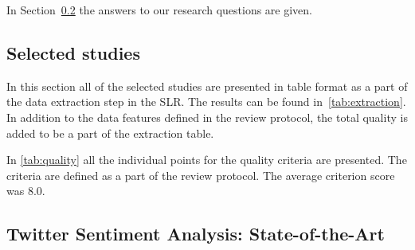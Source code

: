 In Section~\ref{sec:stateofart} the answers to our research questions are given. 

\subsection{Selected studies}
\label{sec:selected}

In this section all of the selected studies are presented in table format as a part of the data extraction step in the SLR. The results can be found in~\autoref{tab:extraction}. In addition to the data features defined in the review protocol, the total quality is added to be a part of the extraction table.



In \autoref{tab:quality} all the individual points for the quality criteria are presented. The criteria are defined as a part of the review protocol. The average criterion score was 8.0.



\subsection{Twitter Sentiment Analysis: State-of-the-Art}
\label{sec:stateofart}
